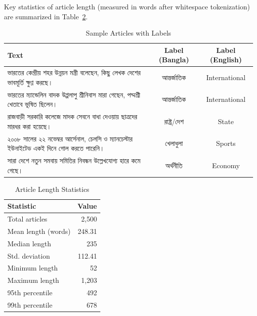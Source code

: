 \documentclass[pdflatex,sn-mathphys-num]{sn-jnl}
\newcommand{\bn}[1]{{\bengalifont #1}}
\theoremstyle{thmstyleone}\newtheorem{theorem}{Theorem}
\theoremstyle{thmstyletwo}\newtheorem{example}{Example}\newtheorem{remark}{Remark}
\theoremstyle{thmstylethree}\newtheorem{definition}{Definition}
\begin{document}
Key statistics of article length (measured in words after whitespace tokenization) are summarized in Table~\ref{tab:length-stats}.

\begin{table}[!htbp]
    \centering
    \caption{Sample Articles with Labels}
    \label{tab:sample-articles}
    \renewcommand{\arraystretch}{1.8}
    \setlength{\tabcolsep}{12pt}
    \begin{tabular}{|p{8cm}|c|c|}
        \hline
        \textbf{Text} & \textbf{Label (Bangla)} & \textbf{Label (English)} \\
        \hline
        \bn{ভারতের কেন্দ্রীয় শহর উন্নয়ন মন্ত্রী বলেছেন, কিছু লেখক দেশের ভাবমূর্তি ক্ষুণ্ণ করছে।} 
            & \bn{আন্তর্জাতিক} & International \\
        \hline
        \bn{ভারতের ম্যান্ডেলিন বাদক উপ্পলাপু শ্রীনিবাস মারা গেছেন, পদ্মশ্রী খেতাবে ভূষিত ছিলেন।} 
            & \bn{আন্তর্জাতিক} & International \\
        \hline
        \bn{রাজবাড়ী সরকারি কলেজে মাদক সেবনে বাধা দেওয়ায় ছাত্রদের মারধর করা হয়েছে।} 
            & \bn{রাষ্ট্র/দেশ} & State \\
        \hline
        \bn{২০০৮ সালের ২২ নভেম্বর আর্সেনাল, চেলসি ও ম্যানচেস্টার ইউনাইটেড একই দিনে গোল করতে পারেনি।} 
            & \bn{খেলাধুলা} & Sports \\
        \hline
        \bn{সারা দেশে নতুন সমবায় সমিতির নিবন্ধন উল্লেখযোগ্য হারে কমে গেছে।} 
            & \bn{অর্থনীতি} & Economy \\
        \hline
    \end{tabular}
\end{table}




\begin{table}[!htbp]
    \centering
    \captionsetup{justification=centering} %
    \caption{Article Length Statistics}
    \label{tab:length-stats}
    \renewcommand{\arraystretch}{2.2}
    \setlength{\tabcolsep}{52pt}
    \begin{tabular}{|l|r|}
        \hline
        \textbf{Statistic} & \textbf{Value} \\
        \hline
        Total articles        & 2,500 \\
        \hline
        Mean length (words)   & 248.31 \\
        \hline
        Median length         & 235 \\
        \hline
        Std. deviation        & 112.41 \\
        \hline
        Minimum length        & 52 \\
        \hline
        Maximum length        & 1,203 \\
        \hline
        95th percentile       & 492 \\
        \hline
        99th percentile       & 678 \\
        \hline
    \end{tabular}
\end{table}
\end{document}
